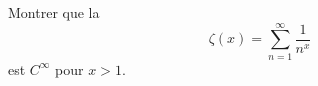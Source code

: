 



\begin{exercice}\label{exo_I-1-11}

Montrer que la 
\begin{equation}
	\zeta(x)=\sum_{n=1}^{\infty}\frac{1}{ n^x }
\end{equation}
est $C^{\infty}$ pour $x>1$.

\end{exercice}
